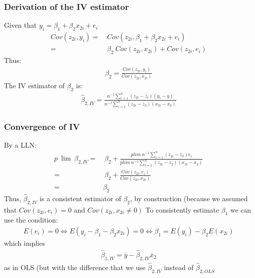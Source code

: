 \documentclass[a4paper,twoside,11pt]{article}
\begin{document}
\subsubsection{Derivation of the IV estimator}
Given that $y_i = \beta_1 + \beta_2 x_{2i} + e_i$
\begin{equation*}
\begin{aligned}
Cov(z_{2i}, y_i) =& \ Cov(z_{2i}, \beta_1 + \beta_2 x_{2i} + e_i) \\
=& \ \beta_2 \ Cov(z_{2i}, x_{2i}) + Cov(z_{2i}, e_i)
\end{aligned} 
\end{equation*}
Thus: 
\begin{equation*}
\begin{aligned}
\beta_2 = \frac{Cov(z_{2i}, y_i)}{Cov(z_{2i},x_{2i})}
\end{aligned} 
\end{equation*}
The IV estimator of $\beta_2$ is:
\begin{equation*}
\begin{aligned}
\hat{\beta}_{2,IV} = \frac{n^{-1}\sum^n_{i=1} (z_{2i}-\bar z_i)(y_i -\bar y)}{n^{-1} \sum^n_{i=1} (z_{2i} - \bar z_2 )(x_{2i} - \bar x_2)}
\end{aligned} 
\end{equation*}
\subsubsection{Convergence of IV}
By a LLN:
\begin{equation*}
\begin{aligned}
p \ \lim \ \hat{\beta}_{2,IV} =& \ \beta_2 + \frac{plim \ n^{-1}\sum^n_{i=1}(z_{2i}-\bar z_2)e_i}{plim \ n^{-1} \sum^n_{i=1} (z_{2i} - \bar z_2)(x_{2i} - \bar x_2)} \\
=& \ \beta_2 + \frac{Cov(z_{2i},e_i)}{Cov(z_{2i}, x_{2i})} \\
=& \beta_2
\end{aligned} 
\end{equation*}
Thus, $\hat{\beta}_{2,IV}$ is a consistent estimator of $\beta_2$, by construction (because we assumed that $Cov(z_{2i},e_i)=0$ and $Cov(z_{2i},x_{2i}\ne 0)$
\newline
\newline
To consistently estimate $\beta_1$ we can use the condition:
\begin{equation*}
\begin{aligned}
E(e_i)= 0 \Leftrightarrow E(y_i - \beta_1 - \beta_2 x_{2i} ) = 0 \Leftrightarrow \beta_1 = E(y_i) - \beta_2 E(x_{2i})
\end{aligned} 
\end{equation*}
which implies
\begin{equation*}
\begin{aligned}
\hat{\beta}_{1,IV} = \bar y - \hat{\beta}_{2,IV} \bar x_2
\end{aligned} 
\end{equation*}
as in OLS (but with the difference that we use $\hat{\beta}_{2,IV}$ instead of $\hat{\beta}_{2,OLS}$
\end{document}
